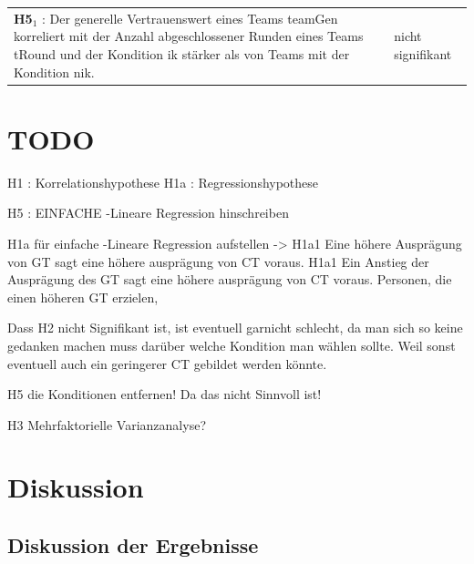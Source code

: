 \documentclass[a4paper,11pt]{article}%
\renewcommand{\\}{\vspace*{0.5\baselineskip} \newline}
\begin{document}
\begin{table}[H]
\begin{tabularx}{\textwidth}{p{12cm} | p{3.5cm}}
		\hline 	\\	
		\textbf{H5$_{1}$} : Der generelle Vertrauenswert eines Teams \ac{teamGen} korreliert mit der Anzahl abgeschlossener Runden eines Teams \ac{tRound} und der Kondition \ac{ik} stärker als von Teams mit der Kondition \ac{nik}. \\
		& nicht signifikant \\
		
		\hline 	\\
		
	\end{tabularx}
\end{table}		

\section{TODO}

H1 : Korrelationshypothese
H1a : Regressionshypothese

H5 : 
EINFACHE -Lineare Regression hinschreiben

H1a für einfache -Lineare  Regression aufstellen -> 
H1a1 Eine höhere Ausprägung von GT sagt eine höhere ausprägung von CT voraus.
H1a1 Ein Anstieg der Ausprägung des GT sagt eine höhere ausprägung von CT voraus.
Personen, die einen höheren GT erzielen, 

Dass H2 nicht Signifikant ist, ist eventuell garnicht schlecht, da man sich so keine gedanken machen muss darüber welche Kondition man wählen sollte. Weil sonst eventuell auch ein geringerer CT gebildet werden könnte.

H5 die Konditionen entfernen! Da das nicht Sinnvoll ist!

H3 Mehrfaktorielle Varianzanalyse?
\section{Diskussion}
	\subsection{Diskussion der Ergebnisse}
\end{document}
